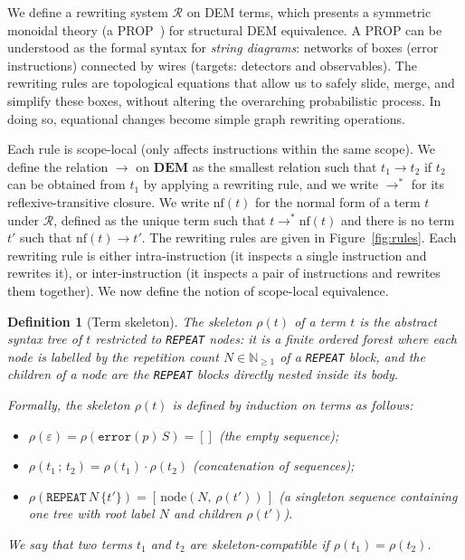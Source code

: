 \documentclass[11pt,a4paper]{article}
\newtheorem{definition}[theorem]{Definition}
\newcommand{\R}{\mathcal{R}}          %
\newcommand{\nf}[1]{\mathrm{nf}(#1)}  %
\newcommand{\tostep}{\to}
\newcommand{\tomany}{\to^{*}}
\begin{document}
We define a rewriting system $\R$ on DEM terms, which presents a symmetric monoidal theory (a PROP~\cite{maclane1965categorical}) for structural DEM equivalence. A PROP can be understood as the formal syntax for \emph{string diagrams}: networks of boxes (error instructions) connected by wires (targets: detectors and observables). The rewriting rules are topological equations that allow us to safely slide, merge, and simplify these boxes, without altering the overarching probabilistic process. In doing so, equational changes become simple graph rewriting operations.

Each rule is scope-local (only affects instructions within the same scope). We define the relation $\tostep$ on $\mathbf{DEM}$ as the smallest relation such that $t_1 \tostep t_2$ if $t_2$ can be obtained from $t_1$ by applying a rewriting rule, and we write $\tomany$ for its reflexive-transitive closure. We write $\nf{t}$ for the normal form of a term $t$ under $\R$, defined as the unique term such that $t \tomany \nf{t}$ and there is no term $t'$ such that $\nf{t} \tostep t'$. The rewriting rules are given in Figure~\ref{fig:rules}. Each rewriting rule is either intra-instruction (it inspects a single instruction and rewrites it), or inter-instruction (it inspects a pair of instructions and rewrites them together). We now define the notion of scope-local equivalence.

\begin{definition}[Term skeleton]
\label{def:skeleton}
The \emph{skeleton} $\rho(t)$ of a term $t$ is the abstract syntax tree of $t$
restricted to \texttt{REPEAT} nodes: it is a finite ordered forest where each
node is labelled by the repetition count $N \in \mathbb{N}_{\geq 1}$  of a \texttt{REPEAT} block, and the children of a node are the \texttt{REPEAT} blocks directly nested inside its body.

Formally, the skeleton $\rho(t)$ is defined by induction on terms as follows:
\begin{itemize}
  \item $\rho(\varepsilon) = \rho(\mathtt{error}(p)\,S) = []$ (the empty sequence);
  \item $\rho(t_1 \,;\, t_2) = \rho(t_1) \cdot \rho(t_2)$ (concatenation of sequences);
  \item $\rho(\mathtt{REPEAT}\,N\,\{t'\}) = [\,\mathrm{node}(N,\,\rho(t'))\,]$ (a singleton sequence containing one tree with root label $N$ and children $\rho(t')$).
\end{itemize}
We say that two terms $t_1$ and $t_2$ are \emph{skeleton-compatible} if $\rho(t_1) = \rho(t_2)$.
\end{definition}
\end{document}
